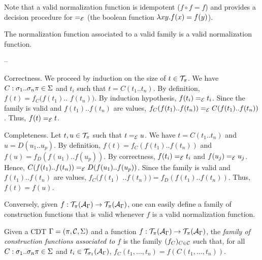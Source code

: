 Note that a valid normalization function is idempotent ($f\circ f=f$)
and provides a decision procedure for $=_\mathcal{E}$ (the boolean function
$\lambda xy.f(x)= f(y)$).


\begin{thm}
\label{thm-f}
The normalization function associated to a valid family is a valid
normalization function.
\end{thm}

\begin{prf}
\begin{lst}{--}
\item Correctness. We proceed by induction on the size of $t\in\mathcal{T}_\pi$.
We have $C:\sigma_1..\sigma_n\pi\in\Sigma$ and $t_i$ such that $t=C(t_1..t_n)$. By
definition, $f(t)=f_C(f(t_1)..$ $f(t_n))$. By induction hypothesis,
$f(t_i)=_\mathcal{E} t_i$. Since the family is valid and $f(t_1)..f(t_n)$ are
values, $f_C(f(t_1)..f(t_n))=_\mathcal{E} C(f(t_1)..f(t_n))$. Thus, $f(t)=_\mathcal{E}
t$.

\item Completeness.
Let $t,u\in\mathcal{T}_\pi$ such that $t=_\mathcal{E} u$. We have $t=C(t_1..t_n)$ and
$u=D(u_1..u_p)$. By definition, $f(t)=f_C(f(t_1)..f(t_n))$ and
$f(u)=f_D(f(u_1)..f(u_p))$. By correctness, $f(t_i)=_\mathcal{E} t_i$ and
$f(u_j)=_\mathcal{E} u_j$. Hence, $C(f(t_1)..f(t_n))=_\mathcal{E}
D(f(u_1)..f(u_p))$. Since the family is valid and $f(t_1)..f(t_n)$ are
values, $f_C(f(t_1)$ $..f(t_n))=f_D(f(t_1)..f(t_n))$. Thus,
$f(t)=f(u)$.\cqfd\\
\end{lst}
\end{prf}


Conversely, given $f:\mathcal{T}_\pi(\mathcal{A}_\Gamma)\rightarrow\mathcal{T}_\pi(\mathcal{A}_\Gamma)$, one can
easily define a family of construction functions that is valid
whenever $f$ is a valid normalization function.

\begin{dfn}
Given a CDT $\Gamma=(\pi,\mathcal{C},\Sigma)$ and a function
$f:\mathcal{T}_\pi(\mathcal{A}_\Gamma)\rightarrow\mathcal{T}_\pi(\mathcal{A}_\Gamma)$, the {\em family of construction
functions associated to $f$} is the family $(f_C)_{C\in\mathcal{C}}$ such
that, for all $C:\sigma_1..\sigma_n\pi\in\Sigma$ and $t_i\in\mathcal{T}_{\sigma_1}(\mathcal{A}_\Gamma)$,
$f_C(t_1, \ldots,t_n)=f(C(t_1, \ldots, t_n))$.
\end{dfn}

